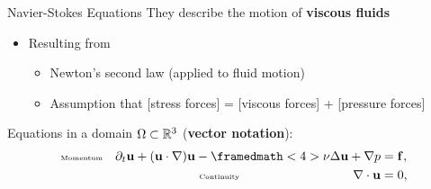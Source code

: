 
\begin{frame}{Navier-Stokes Equations}
  They describe the motion of \textbf{viscous fluids}
  \begin{itemize}\itemsep0.9em
  \item Resulting from
    \begin{itemize}
    \item Newton's second law {\scriptsize\color{PHDgray} (applied to fluid motion)}
    \item {\scriptsize\color{PHDgray} Assumption that} [stress forces] = [viscous forces] + [pressure forces]
    \end{itemize}
  \end{itemize}
    { %
      \begin{block}
      {Equations in a domain $\Omega\subset{\mathbb R}^3$ (\textbf{vector notation}):}
        \vspace{-1em}
        \begin{align*}
          \text{\tiny Momentum}\quad \dt \uu + (\uu\cdot\grad) \uu - \framedmath<4>{\nu}\Delta \uu + \grad\pp &= \ff, \\
          \text{\tiny Continuity}\hspace{21ex} \div\uu &= 0,
        \end{align*}
      \end{block}
    }
    \small
    \begin{itemize}

\end{itemize}
\end{frame}
